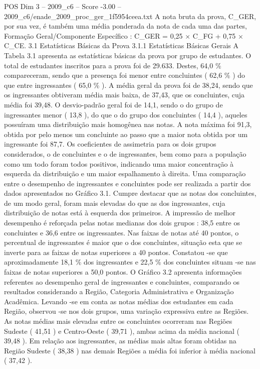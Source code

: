\begin{textsample}{POS Dim 3 – 2009\_c6 – Score -3.00 – 2009\_c6/enade\_2009\_proc\_ger\_1f5954ceea.txt}
A nota bruta da prova, C\_GER, por sua vez, é também uma média ponderada da nota de cada uma das partes, Formação Geral/Componente Específico : C\_GER = 0,25 × C\_FG + 0,75 × C\_CE. 3.1 Estatísticas Básicas da Prova 3.1.1 Estatísticas Básicas Gerais A Tabela 3.1 apresenta as estatísticas básicas da prova por grupo de estudantes.
O total de estudantes inscritos para a prova foi de 29.633.
Destes, 64,0 \% compareceram, sendo que a presença foi menor entre concluintes ( 62,6 \% ) do que entre ingressantes ( 65,0 \% ).
A média geral da prova foi de 38,24, sendo que os ingressantes obtiveram média mais baixa, de 37,43, que os concluintes, cuja média foi 39,48.
O desvio-padrão geral foi de 14,1, sendo o do grupo de ingressantes menor ( 13,8 ), do que o do grupo dos concluintes ( 14,4 ), aqueles possuíram uma distribuição mais homogênea nas notas.
A nota máxima foi 91,3, obtida por pelo menos um concluinte ao passo que a maior nota obtida por um ingressante foi 87,7.
Os coeficientes de assimetria para os dois grupos considerados, o de concluintes e o de ingressantes, bem como para a população como um todo foram todos positivos, indicando uma maior concentração à esquerda da distribuição e um maior espalhamento à direita.
Uma comparação entre o desempenho de ingressantes e concluintes pode ser realizada a partir dos dados apresentados no Gráfico 3.1.
Cumpre destacar que as notas dos concluintes, de um modo geral, foram mais elevadas do que as dos ingressantes, cuja distribuição de notas está à esquerda dos primeiros.
A impressão de melhor desempenho é reforçada pelas notas medianas dos dois grupos : 38,5 entre os concluintes e 36,6 entre os ingressantes.
Nas faixas de notas até 40 pontos, o percentual de ingressantes é maior que o dos concluintes, situação esta que se inverte para as faixas de notas superiores a 40 pontos.
Constatou -se que aproximadamente 18,1 \% dos ingressantes e 22,5 \% dos concluintes situam -se nas faixas de notas superiores a 50,0 pontos.
O Gráfico 3.2 apresenta informações referentes ao desempenho geral de ingressantes e concluintes, comparando os resultados considerando a Região, Categoria Administrativa e Organização Acadêmica.
Levando -se em conta as notas médias dos estudantes em cada Região, observou -se nos dois grupos, uma variação expressiva entre as Regiões.
As notas médias mais elevadas entre os concluintes ocorreram nas Regiões Sudeste ( 41,51 ) e Centro-Oeste ( 39,71 ), ambas acima da média nacional ( 39,48 ).
Em relação aos ingressantes, as médias mais altas foram obtidas na Região Sudeste ( 38,38 ) nas demais Regiões a média foi inferior à média nacional ( 37,42 ).

\end{textsample}
